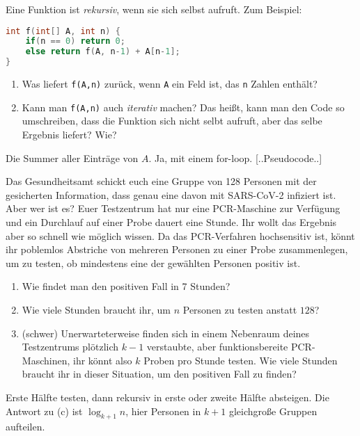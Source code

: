 \documentclass{uebung_cs}
\begin{document}
\begin{aufgabe}
	Eine Funktion ist \emph{rekursiv}, wenn sie sich selbst aufruft. Zum Beispiel:
	\begin{lstlisting}[language=C++]
int f(int[] A, int n) {
	if(n == 0) return 0;
	else return f(A, n-1) + A[n-1];
}\end{lstlisting}
\vspace{-1em}
	\begin{enumerate}
		\item Was liefert \texttt{f(A,n)} zurück, wenn \texttt{A} ein Feld ist, das \texttt{n} Zahlen enthält?
		\item Kann man \texttt{f(A,n)} auch \emph{iterativ} machen? Das heißt, kann man den Code so umschreiben, dass die Funktion sich nicht selbt aufruft, aber das selbe Ergebnis liefert? Wie?
	\end{enumerate}
\end{aufgabe}
\begin{loesung}
	Die Summer aller Einträge von $A$.
	Ja, mit einem for-loop. [..Pseudocode..]
\end{loesung}

\begin{aufgabe}[Coronatests]
	Das Gesundheitsamt schickt euch eine Gruppe von 128 Personen mit der gesicherten Information, dass genau eine davon mit SARS-CoV-2 infiziert ist. Aber wer ist es? Euer Testzentrum hat nur eine PCR-Maschine zur Verfügung und ein Durchlauf auf einer Probe dauert eine Stunde. Ihr wollt das Ergebnis aber so schnell wie möglich wissen. Da das PCR-Verfahren hochsensitiv ist, könnt ihr poblemlos Abstriche von mehreren Personen zu einer Probe zusammenlegen, um zu testen, ob mindestens eine der gewählten Personen positiv ist.
	\begin{enumerate}
		\item Wie findet man den positiven Fall in 7 Stunden?
		\item Wie viele Stunden braucht ihr, um $n$ Personen zu testen anstatt $128$?
		\item (schwer) Unerwarteterweise finden sich in einem Nebenraum deines Testzentrums plötzlich $k-1$ verstaubte, aber funktionsbereite PCR-Maschinen, ihr könnt also $k$ Proben pro Stunde testen. Wie viele Stunden braucht ihr in dieser Situation, um den positiven Fall zu finden?
	\end{enumerate}
\end{aufgabe}
\begin{loesung}
	Erste Hälfte testen, dann rekursiv in erste oder zweite Hälfte absteigen. Die Antwort zu (c) ist $\log_{k+1} n$, hier Personen in $k+1$ gleichgroße Gruppen aufteilen.
\end{loesung}
\end{document}
